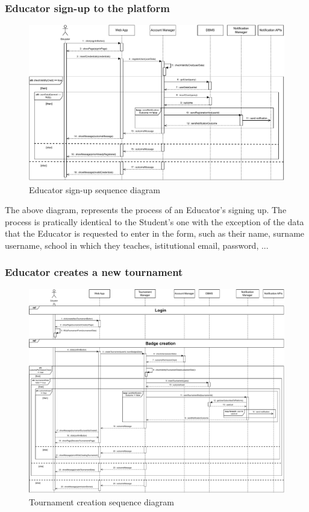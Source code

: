 \documentclass{article}
\begin{document}
{    \subsubsection{Educator sign-up to the platform}
        \begin{figure}[H]
            \centering
            \hspace*{-2.2cm}\includegraphics[scale=0.65]{Sequence/Sequence2DD.pdf}
            \caption{Educator sign-up sequence diagram}
            \label{fig:Sequence2DD}
        \end{figure}

        The above diagram, represents the process of an Educator's signing up.
        The process is pratically identical to the Student's one with the exception of the
        data that the Educator is requested to enter in the form, such as their name, surname
        username, school in which they teaches, istitutional email, password, ... 

    \subsubsection{Educator creates a new tournament}
        \begin{figure}[H]
            \centering
            \hspace*{-4cm}\includegraphics[scale=0.65]{Sequence/Sequence3DD.pdf}
            \caption{Tournament creation sequence diagram}
            \label{fig:Sequence3DD}
        \end{figure}

}
\end{document}
